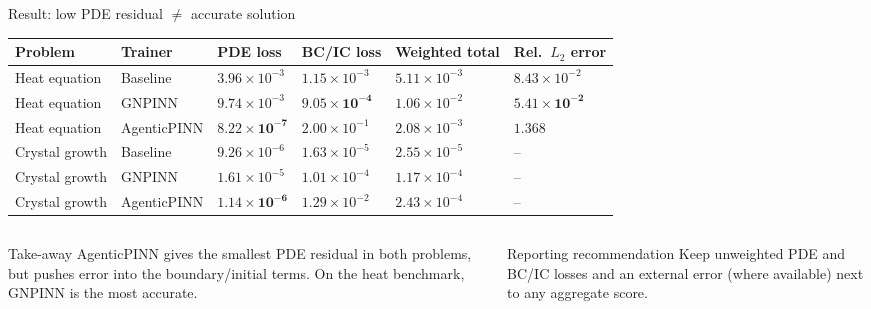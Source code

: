 \documentclass[aspectratio=169,10pt]{beamer}
\begin{document}
\begin{frame}{Result: low PDE residual $\neq$ accurate solution}
\footnotesize
\renewcommand{\arraystretch}{1.15}
\begin{tabularx}{\textwidth}{l l >{\raggedleft\arraybackslash}X >{\raggedleft\arraybackslash}X >{\raggedleft\arraybackslash}X >{\raggedleft\arraybackslash}X}
\toprule
Problem & Trainer & PDE loss & BC/IC loss & Weighted total & Rel.\ $L_2$ error \\
\midrule
Heat equation   & Baseline    & $3.96\times10^{-3}$ & $1.15\times10^{-3}$ & $5.11\times10^{-3}$ & $8.43\times10^{-2}$ \\
Heat equation   & GNPINN      & $9.74\times10^{-3}$ & $\mathbf{9.05\times10^{-4}}$ & $1.06\times10^{-2}$ & $\mathbf{5.41\times10^{-2}}$ \\
Heat equation   & AgenticPINN & $\mathbf{8.22\times10^{-7}}$ & $2.00\times10^{-1}$ & $2.08\times10^{-3}$ & $1.368$ \\
\midrule
Crystal growth  & Baseline    & $9.26\times10^{-6}$ & $1.63\times10^{-5}$ & $2.55\times10^{-5}$ & -- \\
Crystal growth  & GNPINN      & $1.61\times10^{-5}$ & $1.01\times10^{-4}$ & $1.17\times10^{-4}$ & -- \\
Crystal growth  & AgenticPINN & $\mathbf{1.14\times10^{-6}}$ & $1.29\times10^{-2}$ & $2.43\times10^{-4}$ & -- \\
\bottomrule
\end{tabularx}

\vspace{0.2cm}
\begin{columns}[T,onlytextwidth]
\begin{alertblock}{Take-away}
\footnotesize AgenticPINN gives the smallest PDE residual in both problems, but pushes error into the boundary/initial terms. On the heat benchmark, GNPINN is the most accurate.
\end{alertblock}
\begin{block}{Reporting recommendation}
\footnotesize Keep unweighted PDE and BC/IC losses and an external error (where available) next to any aggregate score.
\end{block}
\end{columns}
\end{frame}
\end{document}
